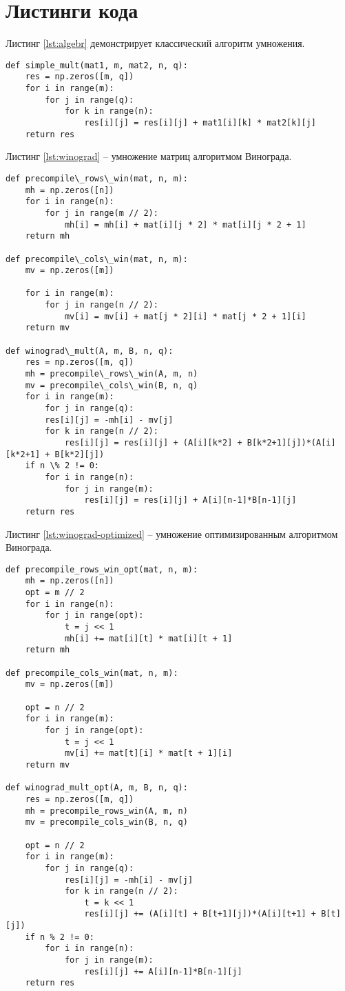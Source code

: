 \section{Листинги кода}
Листинг \ref{lst:algebr} демонстрирует классический алгоритм умножения. 


\captionsetup{singlelinecheck = false, justification=raggedright}
\begin{lstlisting}[label=lst:algebr,caption=Классический алгоритм умножения]
def simple_mult(mat1, m, mat2, n, q):
	res = np.zeros([m, q])
	for i in range(m):
		for j in range(q):
			for k in range(n):
				res[i][j] = res[i][j] + mat1[i][k] * mat2[k][j]
	return res
\end{lstlisting}

\newpage
Листинг \ref{lst:winograd} -- умножение матриц алгоритмом Винограда.

\begin{lstlisting}[label=lst:winograd,caption=Алгоритм умнложения Виноградом]
def precompile\_rows\_win(mat, n, m):
	mh = np.zeros([n])
	for i in range(n):
		for j in range(m // 2):
			mh[i] = mh[i] + mat[i][j * 2] * mat[i][j * 2 + 1]
	return mh

def precompile\_cols\_win(mat, n, m):
	mv = np.zeros([m])
	
	for i in range(m):
		for j in range(n // 2):
			mv[i] = mv[i] + mat[j * 2][i] * mat[j * 2 + 1][i]
	return mv

def winograd\_mult(A, m, B, n, q):
	res = np.zeros([m, q])
	mh = precompile\_rows\_win(A, m, n)
	mv = precompile\_cols\_win(B, n, q)
	for i in range(m):
		for j in range(q):
		res[i][j] = -mh[i] - mv[j]
		for k in range(n // 2):
			res[i][j] = res[i][j] + (A[i][k*2] + B[k*2+1][j])*(A[i][k*2+1] + B[k*2][j])
	if n \% 2 != 0:
		for i in range(n):
			for j in range(m):
				res[i][j] = res[i][j] + A[i][n-1]*B[n-1][j]
	return res

\end{lstlisting}	

\newpage
Листинг \ref{lst:winograd-optimized} -- умножение оптимизированным алгоритмом Винограда.
\begin{lstlisting}[label=lst:winograd-optimized,caption=Оптимизированный алгоритм умножения Виноградом]
def precompile_rows_win_opt(mat, n, m):
	mh = np.zeros([n])
	opt = m // 2
	for i in range(n):
		for j in range(opt):
			t = j << 1
			mh[i] += mat[i][t] * mat[i][t + 1]
	return mh

def precompile_cols_win(mat, n, m):
	mv = np.zeros([m])
	
	opt = n // 2
	for i in range(m):
		for j in range(opt):
			t = j << 1
			mv[i] += mat[t][i] * mat[t + 1][i]
	return mv

def winograd_mult_opt(A, m, B, n, q):
	res = np.zeros([m, q])
	mh = precompile_rows_win(A, m, n)
	mv = precompile_cols_win(B, n, q)
	
	opt = n // 2
	for i in range(m):
		for j in range(q):
			res[i][j] = -mh[i] - mv[j]
			for k in range(n // 2):
				t = k << 1
				res[i][j] += (A[i][t] + B[t+1][j])*(A[i][t+1] + B[t][j])
	if n % 2 != 0:
		for i in range(n):
			for j in range(m):
				res[i][j] += A[i][n-1]*B[n-1][j]
	return res
\end{lstlisting}


